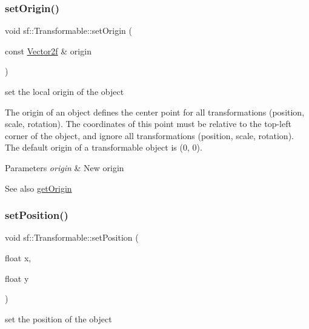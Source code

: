 \subsubsection{\texorpdfstring{set\+Origin()}{setOrigin()}\hspace{0.1cm}{\footnotesize\ttfamily [2/2]}}
{\footnotesize\ttfamily void sf\+::\+Transformable\+::set\+Origin (\begin{DoxyParamCaption}\item[{const \hyperlink{classsf_1_1_vector2}{Vector2f} \&}]{origin }\end{DoxyParamCaption})}



set the local origin of the object 

The origin of an object defines the center point for all transformations (position, scale, rotation). The coordinates of this point must be relative to the top-\/left corner of the object, and ignore all transformations (position, scale, rotation). The default origin of a transformable object is (0, 0).


\begin{DoxyParams}{Parameters}
{\em origin} & New origin\\
\hline
\end{DoxyParams}
\begin{DoxySeeAlso}{See also}
\hyperlink{classsf_1_1_transformable_a37ea3500afac234814a43ce809ef264e}{get\+Origin} 
\end{DoxySeeAlso}
\mbox{\label{classsf_1_1_transformable_a4dbfb1a7c80688b0b4c477d706550208}} 
\subsubsection{\texorpdfstring{set\+Position()}{setPosition()}\hspace{0.1cm}{\footnotesize\ttfamily [1/2]}}
{\footnotesize\ttfamily void sf\+::\+Transformable\+::set\+Position (\begin{DoxyParamCaption}\item[{float}]{x,  }\item[{float}]{y }\end{DoxyParamCaption})}



set the position of the object 

